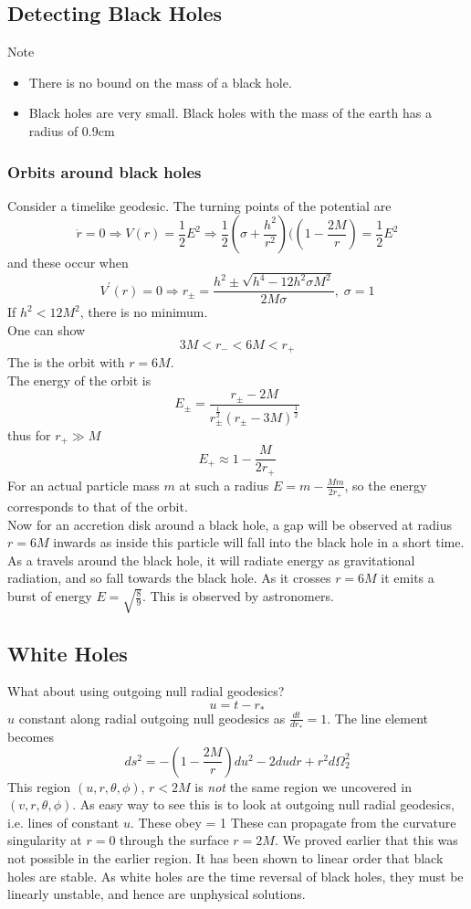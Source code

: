 \documentclass{article}
\begin{document}
\subsection{Detecting Black Holes} 
Note 
\begin{itemize}
    \item There is no bound on the mass of a black hole.
    \item Black holes are very small. Black holes with the mass of the earth has a radius of 0.9cm
\end{itemize}

\subsubsection*{Orbits around black holes}
Consider a timelike geodesic. The turning points of the potential are
\[
\dot{r}=0 \Rightarrow V(r) = \frac{1}{2}E^2 \Rightarrow \frac{1}{2} \left( \sigma + \frac{h^2}{r^2} \right) (\left(1-\frac{2M}{r}\right) = \frac{1}{2}E^2
\]
and these occur when
\[
V^\prime(r)=0 \Rightarrow r_\pm = \frac{h^2 \pm \sqrt{h^4 - 12h^2 \sigma M^2}}{2M\sigma}, \; \sigma=1
\]
If $h^2<12M^2$, there is no minimum. \\
One can show 
\[
3M < r_- < 6M < r_+
\]
The  is the orbit with $r=6M$. \\
The energy of the orbit is 
\[
E_\pm = \frac{r_\pm - 2M}{r_\pm^\frac{1}{2}(r_\pm-3M)^\frac{1}{2}}
\]
thus for $r_+\gg M$
\[
E_+ \approx 1-\frac{M}{2r_+}
\]
For an actual particle mass $m$ at such a radius $E=m-\frac{Mm}{2r_+}$, so the energy corresponds to that of the orbit. \\
Now for an accretion disk around a black hole, a gap will be observed at radius $r=6M$ inwards as inside this particle will fall into the black hole in a short time. As a travels around the black hole, it will radiate energy as gravitational radiation, and so fall towards the black hole. As it crosses $r=6M$ it emits a burst of energy $E=\sqrt{\frac{8}{9}}$. This is observed by astronomers. 

\subsection{White Holes}
What about using outgoing null radial geodesics? 
\[
u=t-r_\ast
\]
$u$ constant along radial outgoing null geodesics as $\frac{dt}{dr_\ast}=1$. The line element becomes 
\[
ds^2 = -(1-\frac{2M}{r}) du^2 - 2dudr + r^2 d\Omega^2_2
\]
This region $(u,r,\theta,\phi)$, $r<2M$ is \emph{not} the same region we uncovered in $(v,r,\theta,\phi)$. As easy way to see this is to look at outgoing null radial geodesics, i.e. lines of constant $u$. These obey 
\be\label{eq:5}
 = 1 
\ee
These can propagate from the curvature singularity at $r=0$ through the surface $r=2M$. We proved earlier that this was not possible in the earlier region. It has been shown to linear order that black holes are stable. As white holes are the time reversal of black holes, they must be linearly unstable, and hence are unphysical solutions. 
\end{document}
